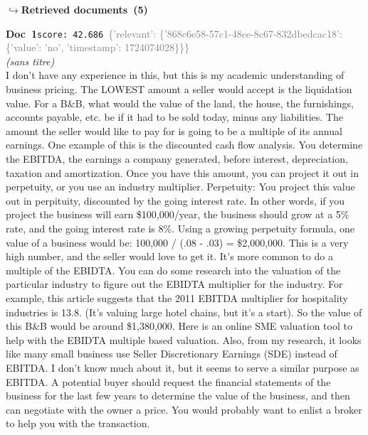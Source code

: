 \documentclass[a4paper,11pt]{article}
\begin{document}
\noindent\hfill{\footnotesize\textcolor{doccolor}{\textbf{$\hookrightarrow$\enspace Retrieved documents~(5)}}}
\begin{docenv}
{\footnotesize\textcolor{doccolor}{\textbf{Doc~1}}}\hfill{\tiny\texttt{score:~42.686}}\ {\tiny\textcolor{gray}{\{'relevant': \{'868c6e58-57c1-48ee-8c67-832dbedcac18': \{'value': 'no', 'timestamp': 1724074028\}\}\}}}\\[3pt]
{\small\textit{(sans titre)}}\\[2pt]
\vspace{2pt}
{\footnotesize 
I don't have any experience in this, but this is my academic understanding of business pricing.  The LOWEST amount a seller would accept is the liquidation value. For a B\&B, what would the value of the land, the house, the furnishings, accounts payable, etc. be if it had to be sold today, minus any liabilities.  The amount the seller would like to pay for is going to be a multiple of its annual earnings. One example of this is the discounted cash flow analysis. You determine the EBITDA, the earnings a company generated, before interest,  depreciation, taxation and amortization.  Once you have this amount, you can project it out in perpetuity, or you use an industry multiplier.  Perpetuity:  You project this value out in perpituity, discounted by the going interest rate. In other words, if you project the business will earn \$100,000/year, the business should grow at a 5\% rate, and the going interest rate is 8\%. Using a growing perpetuity formula, one value of a business would be: 100,000 / (.08 - .03) = \$2,000,000.  This is a very high number, and the seller would love to get it.  It's more common to do a multiple of the EBIDTA. You can do some research into the valuation of the particular industry to figure out the EBIDTA multiplier for the industry. For example, this article suggests that the 2011 EBITDA multiplier for hospitality industries is 13.8. (It's valuing large hotel chains, but it's a start). So the value of this B\&B would be around \$1,380,000. Here is an online SME valuation tool to help with the EBIDTA multiple based valuation. Also, from my research, it looks like many small business use Seller Discretionary Earnings  (SDE) instead of EBITDA. I don't know much about it, but it seems to serve a similar purpose as EBITDA.  A potential buyer should request the financial statements of the business for the last few years to determine the value of the business, and then can negotiate with the owner a price. You would probably want to enlist a broker to help you with the transaction.}
\end{docenv}
\end{document}
